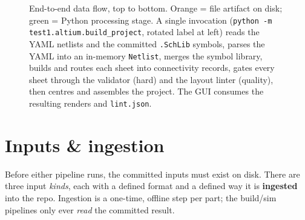 \documentclass[11pt]{article}
\newcommand{\file}[1]{\texttt{#1}}
\begin{document}
\begin{figure}[h]
{%
}
\caption{End-to-end data flow, top to bottom. Orange = file artifact on disk;
green = Python processing stage. A single invocation
(\texttt{python -m test1.altium.build\_project}, rotated label at left) reads the YAML
netlists and the committed \file{.SchLib} symbols, parses the YAML into an
in-memory \texttt{Netlist}, merges the symbol library, builds and routes each
sheet into connectivity records, gates every sheet through the validator (hard)
and the layout linter (quality), then centres and assembles the project. The GUI
consumes the resulting renders and \file{lint.json}.}
\end{figure}

\section{Inputs \& ingestion}\label{sec:ingest}

Before either pipeline runs, the committed inputs must exist on disk. There are
three input \emph{kinds}, each with a defined format and a defined way it is
\textbf{ingested} into the repo. Ingestion is a one-time, offline step per part;
the build/sim pipelines only ever \emph{read} the committed result.
\end{document}
